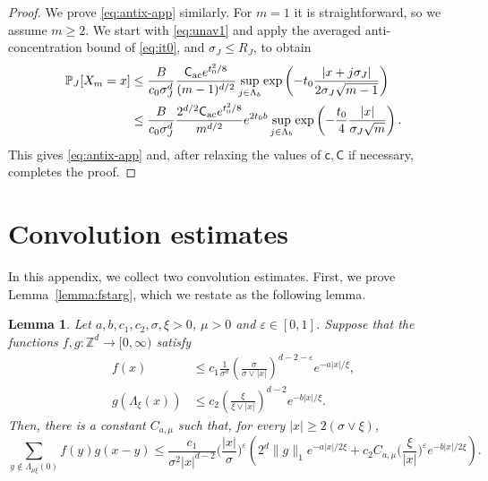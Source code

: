 \documentclass[11pt,a4paper]{article}
\numberwithin{equation}{section}
\theoremstyle{plain}
\newtheorem{Lem}[Thm]{Lemma}
\theoremstyle{definition}
\newcommand\1{\mathds{1}}
\newcommand\CGreen{\mathsf{C}}
\newcommand\cGreen{\mathsf{c}}
\newcommand{\CAC}{\mathsf C_{\textup{ac}}}
\begin{document}
\begin{proof}
We prove \eqref{eq:antix-app} similarly.
For $m=1$ it is straightforward, so we assume $m \ge 2$.
We start with \eqref{eq:unav1} and apply the averaged anti-concentration
bound of \eqref{eq:it0}, and $\sigma_J \le R_J$, to obtain
\begin{align}
    \mathbb P_J[X_{m}=x]
    & \leq \frac{B}{c_0
    \sigma_J^d}
    \frac{\CAC e^{t_0^2/8}}{(m-1)^{d/2}}
    \sup_{j\in\Lambda_{b}}
    \exp\left(-t_0 \frac{|x+j\sigma_J|}{2\sigma_J \sqrt{m-1}}\right)
    \nonumber \\ & \le
    \frac{B}{c_0
    \sigma_J^d}
    \frac{2^{d/2}\CAC e^{t_0^2/8}}{m^{d/2}}
    e^{2t_0 b   }
    \sup_{j\in\Lambda_{b}}
    \exp\left(-
    \frac{t_0}{4} \frac{|x|}{\sigma_J \sqrt{m}}\right).
\end{align}
This gives \eqref{eq:antix-app} and, after relaxing the values of $\cGreen,\CGreen$
if necessary, completes the proof.
\end{proof}



\section{Convolution estimates}\label{appendix:conv estimates}

In this appendix, we collect two convolution estimates.
First, we prove Lemma~\ref{lemma:fstarg}, which we restate as
the following lemma.




\begin{Lem}
Let $a,b,c_1,c_2,\sigma,\xi >0$, $\mu >0$ and $\varepsilon \in [ 0,1]$.
Suppose that the functions $f,g: \mathbb Z^d \to [0,\infty)$ satisfy
\begin{align}
    f(x)
    &\le
    c_1\frac{1}{\sigma^d} \left( \frac{\sigma}{\sigma\vee |x|}\right)^{d-2-\varepsilon}
    e^{-a|x|/\xi},
    \\
    g(\Lambda_\xi(x))
    &\le
    c_2\left( \frac{\xi}{\xi\vee |x|}\right)^{d-2}
    e^{-b|x|/\xi}.
\end{align}
Then, there is a constant $C_{a,\mu}$ such that, for every $|x| \ge 2 (\sigma \vee \xi)$,
\begin{equation}
\label{eq:fstargapp}
    \sum_{y \notin \Lambda_{ \mu \xi}(0)} f(y)g(x-y)
    \le \frac{c_1}{\sigma^2|x|^{d-2}} \Big(\frac{|x|}{\sigma}\Big)^\varepsilon
    \left(
    2^{d} \|g\|_1  e^{-a|x|/2\xi}
    +
    c_2C_{a,\mu}\Big(\frac{\xi}{|x|}\Big)^\varepsilon e^{-b|x|/2\xi}
    \right).
\end{equation}
\end{Lem}
\end{document}
